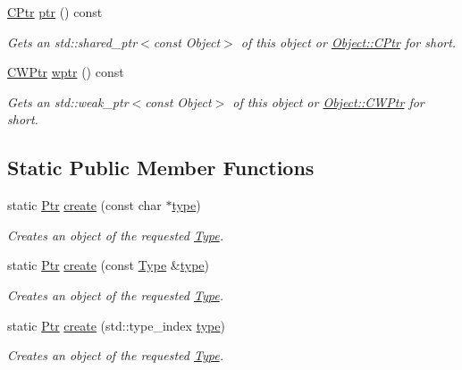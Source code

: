 \begin{DoxyCompactItemize}
\hyperlink{classdg_1_1deepcore_1_1_object_a9929d3554639c9ed70d26aa8ede60cca}{C\+Ptr} \hyperlink{classdg_1_1deepcore_1_1_object_abc06ba7cd66b57139455b4c73c1e3b27}{ptr} () const 
\begin{DoxyCompactList}\small\item\em Gets an std\+::shared\+\_\+ptr$<$const Object$>$ of this object or \hyperlink{classdg_1_1deepcore_1_1_object_a9929d3554639c9ed70d26aa8ede60cca}{Object\+::\+C\+Ptr} for short. \end{DoxyCompactList}\item 
\hyperlink{classdg_1_1deepcore_1_1_object_adc394d82cc6a5fb85e7d65fc065d867f}{C\+W\+Ptr} \hyperlink{classdg_1_1deepcore_1_1_object_a8c2d6656a2bb570c9567ba60bc6c4e07}{wptr} () const 
\begin{DoxyCompactList}\small\item\em Gets an std\+::weak\+\_\+ptr$<$const Object$>$ of this object or \hyperlink{classdg_1_1deepcore_1_1_object_adc394d82cc6a5fb85e7d65fc065d867f}{Object\+::\+C\+W\+Ptr} for short. \end{DoxyCompactList}\end{DoxyCompactItemize}
\subsection*{Static Public Member Functions}
\begin{DoxyCompactItemize}
\item 
static \hyperlink{classdg_1_1deepcore_1_1_object_a4565c5c2ba828aaaa4354befbac8b2f9}{Ptr} \hyperlink{classdg_1_1deepcore_1_1_object_abea39ade7192fc0479cf932767c5ddfc}{create} (const char $\ast$\hyperlink{classdg_1_1deepcore_1_1_object_a80356589437cb086680c6b5fbd8044d4}{type})
\begin{DoxyCompactList}\small\item\em Creates an object of the requested \hyperlink{classdg_1_1deepcore_1_1_type}{Type}. \end{DoxyCompactList}\item 
static \hyperlink{classdg_1_1deepcore_1_1_object_a4565c5c2ba828aaaa4354befbac8b2f9}{Ptr} \hyperlink{classdg_1_1deepcore_1_1_object_a8ceffb0726dfc320c3e4f0f132d31526}{create} (const \hyperlink{classdg_1_1deepcore_1_1_type}{Type} \&\hyperlink{classdg_1_1deepcore_1_1_object_a80356589437cb086680c6b5fbd8044d4}{type})
\begin{DoxyCompactList}\small\item\em Creates an object of the requested \hyperlink{classdg_1_1deepcore_1_1_type}{Type}. \end{DoxyCompactList}\item 
static \hyperlink{classdg_1_1deepcore_1_1_object_a4565c5c2ba828aaaa4354befbac8b2f9}{Ptr} \hyperlink{classdg_1_1deepcore_1_1_object_abebce2036d380211beed7d435e3c8999}{create} (std\+::type\+\_\+index \hyperlink{classdg_1_1deepcore_1_1_object_a80356589437cb086680c6b5fbd8044d4}{type})
\begin{DoxyCompactList}\small\item\em Creates an object of the requested \hyperlink{classdg_1_1deepcore_1_1_type}{Type}. \end{DoxyCompactList}\end{DoxyCompactItemize}
